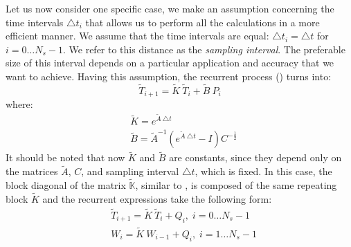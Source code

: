 Let us now consider one specific case, we make an assumption concerning the time intervals $\triangle t_i$ that allows us to perform all the calculations in a more efficient manner. We assume that the time intervals are equal: $\triangle t_i = \triangle t$ for $i = 0 \dots N_s - 1$. We refer to this distance as the \emph{sampling interval}. The preferable size of this interval depends on a particular application and accuracy that we want to achieve. Having this assumption, the recurrent process () turns into:
\[
  \tilde{T}_{i+1} = \tilde{K} \: \tilde{T}_i + \tilde{B} \: P_i
\]
where:
\begin{align*}
  & \tilde{K} = e^{\tilde{A} \: \triangle t} \\
  & \tilde{B} = \tilde{A}^{-1} \left( e^{\tilde{A} \: \triangle t} - I \right) C^{-\frac{1}{2}}
\end{align*}
It should be noted that now $\tilde{K}$ and $\tilde{B}$ are constants, since they depend only on the matrices $\tilde{A}$, $C$, and sampling interval $\triangle t$, which is fixed. In this case, the block diagonal of the matrix $\tilde{\mathbb{K}}$, similar to , is composed of the same repeating block $\tilde{K}$ and the recurrent expressions take the following form:
\begin{align}
  & \tilde{T}_{i + 1} = \tilde{K} \: \tilde{T}_i + Q_i, \; i = 0 \dots N_s - 1 \nonumber \\
  & W_i = \tilde{K} \: W_{i - 1} + Q_i, \; i = 1 \dots N_s - 1 \nonumber
\end{align}
